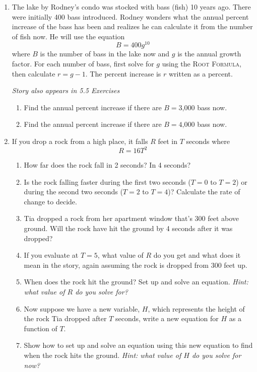 \begin{enumerate}
\item The lake by Rodney's condo was stocked with bass (fish) 10 years ago.  There were initially 400 bass introduced.  Rodney wonders what the annual percent increase of the bass has been and realizes he can calculate it from the number of fish now.  He will use the equation $$B=400 g^{10}$$
where  $B$ is the number of bass in the lake now and $g$ is the annual growth factor.  For each number of bass, first solve for $g$ using the \textsc{Root Formula}, then calculate $r=g-1$.  The percent increase is $r$ written as a percent.

\hfill \emph{Story also appears in 5.5 Exercises}
\begin{enumerate}
\item Find the annual percent increase if there are $B=\text{3,000}$ bass now.
\item Find the annual percent increase if there are $B=\text{4,000}$ bass now.
\end{enumerate}

\item If you drop a rock from a high place, it falls $R$ feet in $T$ seconds where 
$$R = 16T^2$$
\begin{enumerate}
\item How far does the rock fall in 2 seconds? In 4 seconds?
\item Is the rock falling faster during the first two seconds ($T=0$ to $T=2$) or during the second two seconds ($T=2$ to $T=4$)?   Calculate the rate of change to decide.
\item Tia dropped a rock from her apartment window that's 
 300 feet above ground. Will the rock have hit the ground by 4 seconds after it was dropped?
\item If you evaluate at $T=5$, what value of $R$ do you get and what does it mean in the story, again assuming the rock is dropped from 300 feet up.
\item When does the rock hit the ground?  Set up and solve an equation.  \emph{Hint: what value of $R$ do you solve for?}
\item Now suppose we have a new variable, $H$, which represents the height of the rock Tia dropped after $T$ seconds, write a new equation for $H$ as a function of $T$.  
\item Show how to set up and solve an equation using this new equation to find when the rock hits the ground.  \emph{Hint:  what value of $H$ do you solve for now?}
\end{enumerate}


\end{enumerate}
